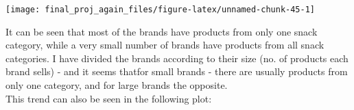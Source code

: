 \documentclass[
]{article}
\newenvironment{Shaded}{\begin{snugshade}}{\end{snugshade}}
\newcommand{\DataTypeTok}[1]{\textcolor[rgb]{0.13,0.29,0.53}{#1}}
\newcommand{\DecValTok}[1]{\textcolor[rgb]{0.00,0.00,0.81}{#1}}
\newcommand{\FloatTok}[1]{\textcolor[rgb]{0.00,0.00,0.81}{#1}}
\newcommand{\KeywordTok}[1]{\textcolor[rgb]{0.13,0.29,0.53}{\textbf{#1}}}
\newcommand{\NormalTok}[1]{#1}
\newcommand{\OperatorTok}[1]{\textcolor[rgb]{0.81,0.36,0.00}{\textbf{#1}}}
\newcommand{\OtherTok}[1]{\textcolor[rgb]{0.56,0.35,0.01}{#1}}
\newcommand{\StringTok}[1]{\textcolor[rgb]{0.31,0.60,0.02}{#1}}
\begin{document}
\begin{Shaded}
\end{Shaded}

\begin{center}\texttt{[image: final\_proj\_again\_files/figure-latex/unnamed-chunk-45-1]} \end{center}

It can be seen that most of the brands have products from only one snack
category, while a very small number of brands have products from all
snack categories. I have divided the brands according to their size (no.
of products each brand sells) - and it seems thatfor small brands -
there are usually products from only one category, and for large brands
the opposite.\\
This trend can also be seen in the following plot:
\end{document}
